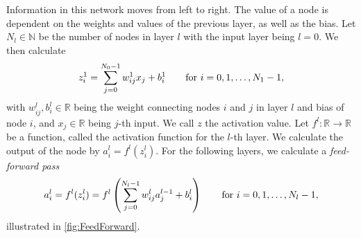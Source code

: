 \documentclass{article}
\theoremstyle{definition}
\begin{document}
Information in this network moves from left to right. The value of a node is dependent on the weights and values of the previous layer, as well as the bias. Let $N_l \in \mathbb{N}$ be the number of nodes in layer $l$ with the input layer being $l = 0$. We then calculate
\begin{equation*}
    z_{i}^1 = \sum_{j = 0}^{N_0 - 1} w_{ij}^1 x_j + b_i^1 \qquad \textnormal{for} \ i = 0, 1, \ldots, N_1 - 1,
\end{equation*}
with $w^l_{ij}, b^l_i \in \mathbb{R}$ being the weight connecting nodes $i$ and $j$ in layer $l$ and bias of node $i$, and $x_j \in \mathbb{R}$ being $j$-th input. We call $z$ the activation value. Let $f^l: \mathbb{R} \to \mathbb{R}$ be a function, called the activation function for the $l$-th layer. We calculate the output of the node by $a_i^l = f^l(z_i^l)$. For the following layers, we calculate a \textit{feed-forward pass}
\begin{equation*}
    a_i^l = f^l(z_{i}^l) = f^l \left( \sum_{j = 0}^{N_l - 1} w_{ij}^l a_j^{l-1} + b_i^{l} \right) \qquad \textnormal{for} \ i = 0, 1, \ldots, N_l - 1,
\end{equation*}
illustrated in \autoref{fig:FeedForward}.
\end{document}
